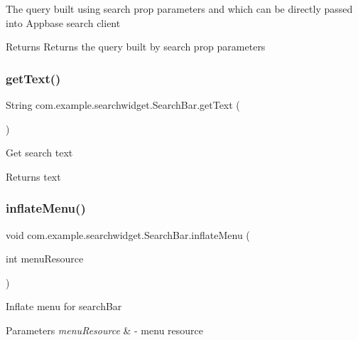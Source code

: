 The query built using search prop parameters and which can be directly passed into Appbase search client

\begin{DoxyReturn}{Returns}
Returns the query built by search prop parameters 
\end{DoxyReturn}
\mbox{\label{classcom_1_1example_1_1searchwidget_1_1_search_bar_a91a9c3d2ffd4729c083325d8e2ce952d}} 
\subsubsection{\texorpdfstring{getText()}{getText()}}
{\footnotesize\ttfamily String com.\+example.\+searchwidget.\+Search\+Bar.\+get\+Text (\begin{DoxyParamCaption}{ }\end{DoxyParamCaption})}

Get search text

\begin{DoxyReturn}{Returns}
text 
\end{DoxyReturn}
\mbox{\label{classcom_1_1example_1_1searchwidget_1_1_search_bar_a3b4bfd362b0867b487bb2cc354232e3e}} 
\subsubsection{\texorpdfstring{inflateMenu()}{inflateMenu()}\hspace{0.1cm}{\footnotesize\ttfamily [1/2]}}
{\footnotesize\ttfamily void com.\+example.\+searchwidget.\+Search\+Bar.\+inflate\+Menu (\begin{DoxyParamCaption}\item[{int}]{menu\+Resource }\end{DoxyParamCaption})}

Inflate menu for search\+Bar


\begin{DoxyParams}{Parameters}
{\em menu\+Resource} & -\/ menu resource \\
\hline
\end{DoxyParams}
\mbox{\label{classcom_1_1example_1_1searchwidget_1_1_search_bar_a71f7fc6ed5b0797b263734590ef49a16}} 
